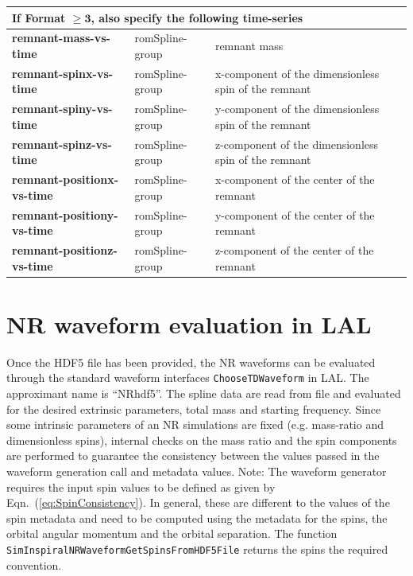 \documentclass[11pt,tightenlines,article,amssymb,amsmath,amsfonts,superscriptaddress,nofootinbib]{revtex4}
\begin{document}
\begin{longtable}{|p{4cm}|p{2.5cm}|p{9.6cm}|}
\hline

\multicolumn{3}{|l|}{
  \rule[-.7em]{0pt}{2em}
       {\bf If Format \boldmath $\mathbf{\ge 3}$, also specify the following time-series}}\\ \hline

\textbf{remnant-mass-vs-time} & romSpline-group &  remnant mass\\
\textbf{remnant-spinx-vs-time} & romSpline-group & x-component of the dimensionless spin of the remnant \\
\textbf{remnant-spiny-vs-time} & romSpline-group & y-component of the dimensionless spin of the remnant \\
\textbf{remnant-spinz-vs-time} & romSpline-group & z-component of the dimensionless spin of the remnant \\
\textbf{remnant-positionx-vs-time} & romSpline-group & x-component of the center of the remnant \\
\textbf{remnant-positiony-vs-time} & romSpline-group & y-component of the center of the remnant \\
\textbf{remnant-positionz-vs-time} & romSpline-group & z-component of the center of the remnant 
\end{longtable}


\section{NR waveform evaluation in LAL}
\label{sec:gen}
Once the HDF5 file has been provided, the NR waveforms can be evaluated through the standard waveform interfaces \texttt{ChooseTDWaveform} in LAL. The approximant name is ``NR\textunderscore hdf5''. 
The spline data are read from file and evaluated for the desired extrinsic parameters, total mass and starting frequency. Since some intrinsic parameters of an NR simulations are fixed (e.g. mass-ratio and dimensionless spins), internal checks on the mass ratio and the spin components are performed to guarantee the consistency between the values passed in the waveform generation call and metadata values. 
Note: The waveform generator requires the input spin values to be defined as given by Eqn.~(\ref{eq:SpinConsistency}). In general, these are different to the values of the spin metadata and need to be computed using the metadata for the spins, the orbital angular momentum and the orbital separation. The function \texttt{SimInspiralNRWaveformGetSpinsFromHDF5File} returns the spins the required convention. 
\end{document}
